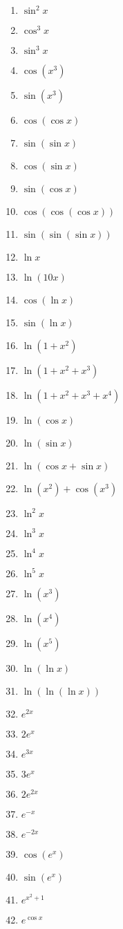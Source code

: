 \documentclass{article}
\begin{document}
\begin{multicols}{3}
\begin{enumerate}
    \item $\sin^2 x$
    \item $\cos^3 x$
    \item $\sin^3 x$
    \item $\cos(x^3)$
    \item $\sin(x^3)$
    \item $\cos(\cos x)$
    \item $\sin(\sin x)$
    \item $\cos(\sin x)$
    \item $\sin(\cos x)$
    \item $\cos(\cos(\cos x))$
    \item $\sin(\sin(\sin x))$
    \item $\ln x$
    \item $\ln(10x)$
    \item $\cos(\ln x)$
    \item $\sin(\ln x)$
    \item $\ln(1+x^2)$
    \item $\ln(1+x^2+x^3)$
    \item $\ln(1+x^2+x^3+x^4)$
    \item $\ln(\cos x)$
    \item $\ln(\sin x)$
    \item $\ln(\cos x+\sin x)$
    \item $\ln(x^2)+\cos(x^3)$
    \item $\ln^2 x$
    \item $\ln^3 x$
    \item $\ln^4 x$
    \item $\ln^5 x$
    \item $\ln(x^3)$
    \item $\ln(x^4)$
    \item $\ln(x^5)$
    \item $\ln(\ln x)$
    \item $\ln(\ln(\ln x))$
    \item $e^{2x}$
    \item $2e^x$
    \item $e^{3x}$
    \item $3e^x$
    \item $2e^{2x}$
    \item $e^{-x}$
    \item $e^{-2x}$
    \item $\cos(e^x)$
    \item $\sin(e^x)$
    \item $e^{x^2+1}$
    \item $e^{\cos x}$

\end{enumerate}
\end{multicols}
\end{document}
